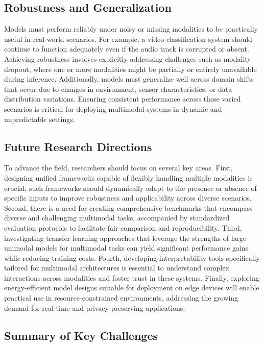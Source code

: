 \documentclass[sigconf]{acmart}
\begin{document}
\subsection{Robustness and Generalization}
Models must perform reliably under noisy or missing modalities to be practically useful in real-world scenarios. For example, a video classification system should continue to function adequately even if the audio track is corrupted or absent. Achieving robustness involves explicitly addressing challenges such as modality dropout, where one or more modalities might be partially or entirely unavailable during inference. Additionally, models must generalize well across domain shifts that occur due to changes in environment, sensor characteristics, or data distribution variations. Ensuring consistent performance across these varied scenarios is critical for deploying multimodal systems in dynamic and unpredictable settings.

\subsection{Future Research Directions}
To advance the field, researchers should focus on several key areas. First, designing unified frameworks capable of flexibly handling multiple modalities is crucial; such frameworks should dynamically adapt to the presence or absence of specific inputs to improve robustness and applicability across diverse scenarios. Second, there is a need for creating comprehensive benchmarks that encompass diverse and challenging multimodal tasks, accompanied by standardized evaluation protocols to facilitate fair comparison and reproducibility. Third, investigating transfer learning approaches that leverage the strengths of large unimodal models for multimodal tasks can yield significant performance gains while reducing training costs. Fourth, developing interpretability tools specifically tailored for multimodal architectures is essential to understand complex interactions across modalities and foster trust in these systems. Finally, exploring energy-efficient model designs suitable for deployment on edge devices will enable practical use in resource-constrained environments, addressing the growing demand for real-time and privacy-preserving applications.

\subsection*{Summary of Key Challenges}
\end{document}
